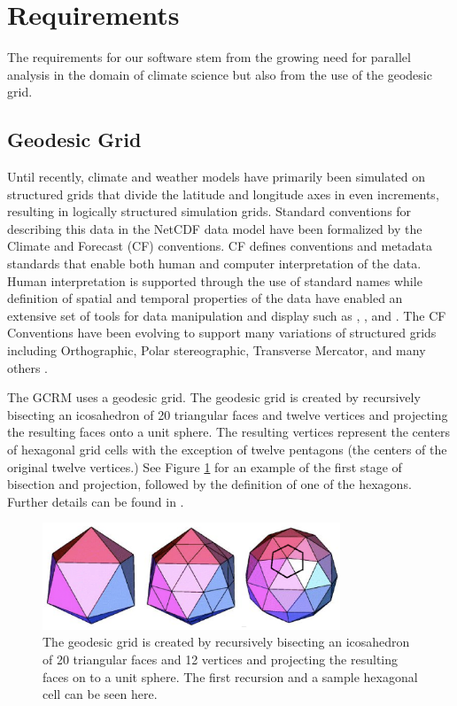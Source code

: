 \section{Requirements}
\label{section:requirements}

The requirements for our software stem from the growing need for parallel
analysis in the domain of climate science\cite{MODSIM07:LOT} but also from
the use of the geodesic grid.

\subsection{Geodesic Grid}
\label{subsection:grid}

Until recently, climate and weather models have primarily been simulated on
structured grids that divide the latitude and longitude axes in even
increments, resulting in logically structured simulation grids. Standard
conventions for describing this data in the NetCDF data model have been
formalized by the Climate and Forecast (CF) conventions\cite{CF}. CF defines
conventions and metadata standards that enable both human and computer
interpretation of the data.  Human interpretation is supported through the use
of standard names while definition of spatial and temporal properties of the
data have enabled an extensive set of tools for data manipulation and display
such as \cite{NCO}, \cite{OPeNDAP}, and \cite{FERRET}.  The CF Conventions
have been evolving to support many variations of structured grids including
Orthographic, Polar stereographic, Transverse Mercator, and many others . 

The GCRM uses a geodesic grid.  The geodesic grid is created by recursively
bisecting an icosahedron of 20 triangular faces and twelve vertices and
projecting the resulting faces onto a unit sphere.  The resulting vertices
represent the centers of hexagonal grid cells with the exception of twelve
pentagons (the centers of the original twelve vertices.) See Figure
\ref{fig:geodesic} for an example of the first stage of bisection and
projection, followed by the definition of one of the hexagons.  Further
details can be found in \cite{GEODESIC}.

\begin{figure}[!t]
\center
\includegraphics[width=3.5in]{images/geodesic2}
\caption{The geodesic grid is created by recursively bisecting an icosahedron
of 20 triangular faces and 12 vertices and projecting the resulting faces on
to a unit sphere.  The first recursion and a sample hexagonal cell can be seen
here.}
\label{fig:geodesic}
\end{figure}

